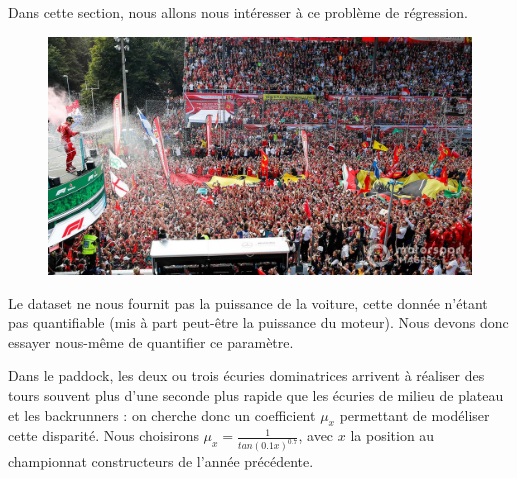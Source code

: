 \documentclass[11pt]{article}
\begin{document}
Dans cette section, nous allons nous intéresser à ce problème de
régression.

\begin{figure}
\centering
\includegraphics{leclerc_monza.jpg}
\end{figure}

    Le dataset ne nous fournit pas la puissance de la voiture, cette donnée
n'étant pas quantifiable (mis à part peut-être la puissance du moteur).
Nous devons donc essayer nous-même de quantifier ce paramètre.

Dans le paddock, les deux ou trois écuries dominatrices arrivent à
réaliser des tours souvent plus d'une seconde plus rapide que les
écuries de milieu de plateau et les backrunners : on cherche donc un
coefficient \(\mu_x\) permettant de modéliser cette disparité. Nous
choisirons \(\mu_x = \frac{1}{tan(0.1x)^{0.7}}\), avec \(x\) la position
au championnat constructeurs de l'année précédente.
\end{document}
